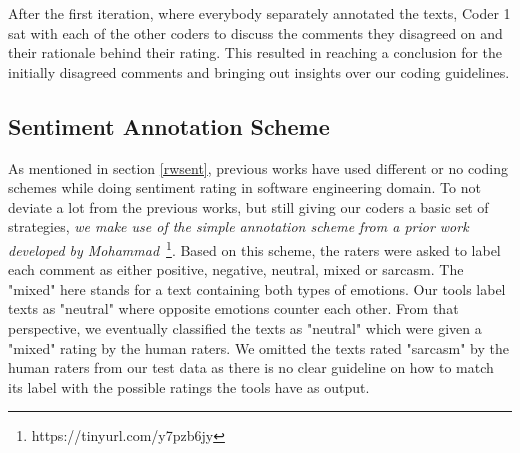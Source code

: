After the first iteration, where everybody separately annotated the texts, Coder 1 sat with each of the other coders to discuss the comments they disagreed on and their rationale behind their rating. This resulted in reaching a conclusion for the initially disagreed comments and bringing out insights over our coding guidelines.

\subsection{Sentiment Annotation Scheme}\label{sentscheme}


As mentioned in section \ref{rwsent}, previous works have used different or no coding schemes while doing sentiment rating in software engineering domain. To not deviate a lot from the previous works, but still giving our coders a basic set of strategies, 
\textit{we make use of the simple annotation scheme 
from a prior work developed by Mohammad}~\cite{mohammad2016practical}\footnote{https://tinyurl.com/y7pzb6jy}. 
Based on this scheme, the raters were asked to label each comment as either positive, negative, neutral, mixed or sarcasm. The "mixed" here stands for a text containing both types of emotions. Our tools label texts as "neutral" where opposite emotions counter each other. From that perspective, we eventually classified the texts as "neutral" which were given a "mixed" rating by the human raters. We omitted the texts rated "sarcasm" by the human raters from our test data as there is no clear guideline on how to match its label with the possible ratings the tools have as output. 

